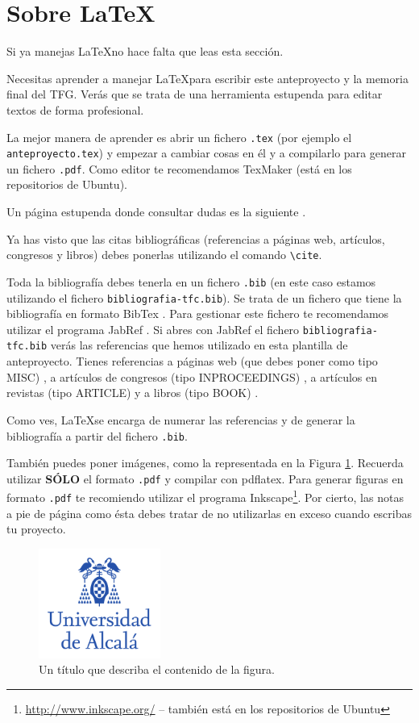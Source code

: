 \documentclass[12pt,oneside,a4paper]{article}
\begin{document}
\section{Sobre \LaTeX}

Si ya manejas \LaTeX no hace falta que leas esta sección.

Necesitas aprender a manejar \LaTeX para escribir este anteproyecto y la memoria final del TFG. Verás que se trata de una herramienta estupenda para editar textos de forma profesional.

La mejor manera de aprender es abrir un fichero \verb$.tex$ (por ejemplo el \verb$anteproyecto.tex$) y empezar a cambiar cosas en él y a compilarlo para generar un fichero \verb$.pdf$. Como editor te recomendamos TexMaker \cite{texmaker} (está en los repositorios de Ubuntu).

Un página estupenda donde consultar dudas es la siguiente \cite{wikibook}.

Ya has visto que las citas bibliográficas (referencias a páginas web, artículos, congresos y libros) debes ponerlas utilizando el comando \verb$\cite$.

Toda la bibliografía debes tenerla en un fichero \verb$.bib$ (en este caso estamos utilizando el fichero \verb$bibliografia-tfc.bib$). Se trata de un fichero que tiene la bibliografía en formato BibTex \cite{bibtex}. Para gestionar este fichero te recomendamos utilizar el programa JabRef \cite{jabref}. Si abres con JabRef el fichero \verb$bibliografia-tfc.bib$ verás las referencias que hemos utilizado en esta plantilla de anteproyecto. Tienes referencias a páginas web (que debes poner como tipo MISC) \cite{bibtex,jabref,wikibook}, a artículos de congresos (tipo INPROCEEDINGS) \cite{Lowe1999}, a artículos en revistas (tipo ARTICLE) \cite{Tuytelaars2008} y a libros (tipo BOOK) \cite{hartley2006}.

Como ves, \LaTeX se encarga de numerar las referencias y de generar la bibliografía a partir del fichero \verb$.bib$.

También puedes poner imágenes, como la representada en la Figura \ref{fig:ejemplo}. Recuerda utilizar \textbf{SÓLO} el formato \verb$.pdf$ y compilar con pdflatex. Para generar figuras en formato \verb$.pdf$ te recomiendo utilizar el programa Inkscape\footnote{\url{http://www.inkscape.org/} -- también está en los repositorios de Ubuntu}. Por cierto, las notas a pie de página como ésta debes tratar de no utilizarlas en exceso cuando escribas tu proyecto.

\begin{figure}
  \centering
  \includegraphics[width=4cm]{figuras/logo-uah.pdf}
  \caption{Un título que describa el contenido de la figura.}
  \label{fig:ejemplo}
\end{figure}




\end{document}
